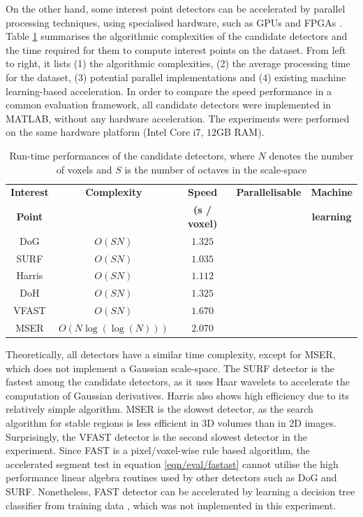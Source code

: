 On the other hand, some interest point detectors can be accelerated by parallel processing techniques, using specialised hardware, such as GPUs and FPGAs \cite{Sinha2006, Cornelis2008, Teixeira2008, Bhatia2007, Dohi2011, Kristensen2007}. Table \ref{tab/eval/speedtable} summarises the algorithmic complexities of the candidate detectors and the time required for them to compute interest points on the \meshset dataset. From left to right, it lists (1) the algorithmic complexities, (2) the average processing time for the \meshset dataset, (3) potential parallel implementations and (4) existing machine learning-based acceleration. 
In order to compare the speed performance in a common evaluation framework, all candidate detectors were implemented in MATLAB, without any hardware acceleration. The experiments were performed on the same hardware platform (Intel Core i7, $12$GB RAM). 

\begin{table}
\centering
\begin{tabular}{|c|cccc|}
\hline
\textbf{Interest} & \textbf{Complexity} & \textbf{Speed} & \textbf{Parallelisable} & \textbf{Machine} \\
\textbf{Point} & & \textbf{(\bm{$\mu$}s / voxel)} & & \textbf{learning} 	\\ 	
\hline
DoG 		& $O(SN)$ 			& $1.325 $ 			& \checkmark \cite{Sinha2006} & \\
SURF 		& $O(SN)$ 			& $1.035 $ 			& \checkmark \cite{Cornelis2008} & \\
Harris 		& $O(SN)$ 			& $1.112 $ 			& \checkmark \cite{Teixeira2008} & \\
DoH			& $O(SN)$ 			& $1.325 $ 			& \checkmark \cite{Bhatia2007} \\
VFAST 		& $O(SN)$ 			& $1.670 $ 			& \checkmark \cite{Dohi2011} & \checkmark \cite{Rosten2010}\\
MSER 		& $O(N\log(\log(N)))$ 	& $2.070 $ 			& \checkmark \cite{Kristensen2007} &\\
\hline
\end{tabular}
\caption{Run-time performances of the candidate detectors, where $N$ denotes the number of voxels and $S$ is the number of octaves in the scale-space}
\label{tab/eval/speedtable}
\end{table}

Theoretically, all detectors have a similar time complexity, except for MSER, which does not implement a Gaussian scale-space. The SURF detector is the fastest among the candidate detectors, as it uses Haar wavelets to accelerate the computation of Gaussian derivatives. Harris also shows high efficiency due to its relatively simple algorithm. MSER is the slowest detector, as the search algorithm for stable regions is less efficient in 3D volumes than in 2D images. Surprisingly, the VFAST detector is the second slowest detector in the experiment. Since FAST is a pixel/voxel-wise rule based algorithm, the accelerated segment test in equation \ref{eqn/eval/fastast} cannot utilise the high performance linear algebra routines used by other detectors such as DoG and SURF. Nonetheless, FAST detector can be accelerated by learning a decision tree classifier from training data \cite{Rosten2010}, which was not implemented in this experiment.

